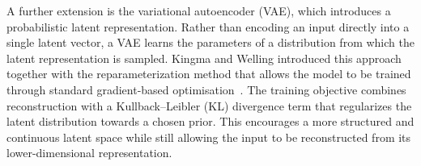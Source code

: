 A further extension is the variational autoencoder (VAE), which introduces a probabilistic latent representation. 
Rather than encoding an input directly into a single latent vector, a VAE learns the parameters of a distribution from which the latent representation is sampled. 
Kingma and Welling introduced this approach together with the reparameterization method that allows the model to be trained through standard gradient-based optimisation~\cite{KingmaWelling2014}. 
The training objective combines reconstruction with a Kullback–Leibler (KL) divergence term that regularizes the latent distribution towards a chosen prior. 
This encourages a more structured and continuous latent space while still allowing the input to be reconstructed from its lower-dimensional representation.